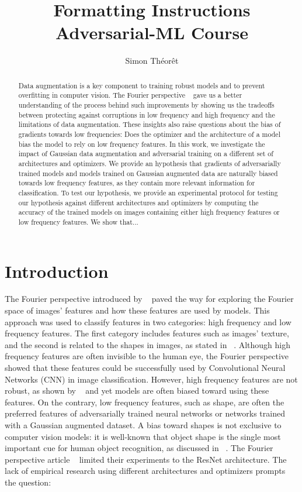 \documentclass{article} \author{Simon Théorêt}
\title{Formatting Instructions Adversarial-ML Course}
\begin{document}
\maketitle

\begin{abstract}
  Data augmentation is a key component to training robust models and
  to prevent overfitting in computer vision. The Fourier perspective
  ~\citep{yin2020fourier} gave us a better understanding of the
  process behind such improvements by showing us the tradeoffs between
  protecting against corruptions in low frequency and high frequency
  and the limitations of data augmentation. These insights also raise
  questions about the bias of gradients towards low frequencies: Does
  the optimizer and the architecture of a model bias the model to rely
  on low frequency features. In this work, we investigate the impact
  of Gaussian data augmentation and adversarial training on a
  different set of architectures and optimizers. We provide an
  hypothesis that gradients of adversarially trained models and models
  trained on Gaussian augmented data are naturally biased towards low
  frequency features, as they contain more relevant information for
  classification. To test our hypothesis, we provide an experimental
  protocol for testing our hypothesis against different architectures
  and optimizers by computing the accuracy of the trained models on
  images containing either high frequency features or low frequency
  features. We show that... %
\end{abstract}
\section{Introduction}
The Fourier perspective introduced by ~\citep{yin2020fourier} paved
the way for exploring the Fourier space of images’ features and how
these features are used by models. This approach was used to classify
features in two categories: high frequency and low frequency
features. The first category includes features such as images’
texture, and the second is related to the shapes in images, as stated
in ~\citep{krishnamachari2023fourier}. Although high frequency
features are often invisible to the human eye, the Fourier perspective
showed that these features could be successfully used by Convolutional
Neural Networks (CNN) in image classification. However, high frequency
features are not robust, as shown by ~\citep{zhang2019interpreting}
and yet models are often biased toward using these features. On the
contrary, low frequency features, such as shape, are often the
preferred features of adversarially trained neural networks or
networks trained with a Gaussian augmented dataset. A bias toward
shapes is not exclusive to computer vision models: it is well-known
that object shape is the single most important cue for human object
recognition, as discussed in ~\citep{landau}. The Fourier perspective
article ~\citep{yin2020fourier} limited their experiments to the
ResNet architecture. The lack of empirical research using different
architectures and optimizers prompts the question:
\end{document}
